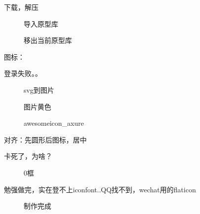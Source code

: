 \documentclass[letterpaper,11pt,english]{sphinxmanual}
\begin{document}
下载，解压

\begin{figure}[H]
\centering
\capstart

\noindent{}
\caption{导入原型库}\label{\detokenize{chapter_knowledge/static_page:id5}}\end{figure}

\begin{figure}[H]
\centering
\capstart

\noindent{}
\caption{移出当前原型库}\label{\detokenize{chapter_knowledge/static_page:id6}}\end{figure}

图标：

登录失败。。

\begin{figure}[H]
\centering
\capstart

\noindent{}
\caption{svg到图片}\label{\detokenize{chapter_knowledge/static_page:id7}}\end{figure}

\begin{figure}[H]
\centering
\capstart

\noindent{}
\caption{图片黄色}\label{\detokenize{chapter_knowledge/static_page:id8}}\end{figure}

\begin{figure}[H]
\centering
\capstart

\noindent{}
\caption{awesomeicon\_axure}\label{\detokenize{chapter_knowledge/static_page:id9}}\end{figure}


对齐：先圆形后图标，居中

卡死了，为啥？

\begin{figure}[H]
\centering
\capstart

\noindent{}
\caption{0框}\label{\detokenize{chapter_knowledge/static_page:id10}}\end{figure}

勉强做完，实在登不上iconfont..QQ找不到，wechat用的flaticon

\begin{figure}[H]
\centering
\capstart

\noindent{}
\caption{制作完成}\label{\detokenize{chapter_knowledge/static_page:id11}}\end{figure}
\end{document}
